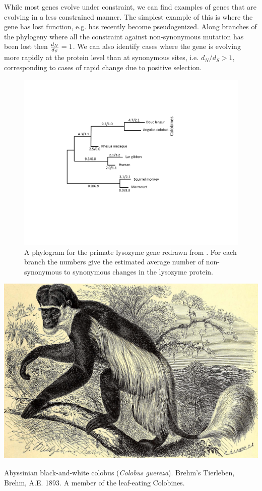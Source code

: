 While most genes evolve under constraint, we can find examples of
genes that are evolving in a less constrained manner. The simplest
example of this is where the gene has lost function, e.g. has recently
become pseudogenized. Along branches of the phylogeny where all the
constraint against non-synonymous mutation has
been lost then $\frac{d_N}{d_S}=1$. We can also identify cases where the gene
is evolving more rapidly at the protein level than at synonymous
sites, i.e. $d_N/d_S > 1$, corresponding to cases of rapid change due
to positive selection. 

\begin{figure}
\begin{center}
\includegraphics[width=0.8 \textwidth]{Journal_figs/genetic_drift/Yang_lysozyme/Yang_lysozyme.pdf}
\end{center}
\caption{A phylogram for the primate lysozyme gene redrawn from
  \citeauthor{Yang:98}. For each branch the numbers give the estimated average
number of non-synonymous to synonymous changes in the lysozyme protein.} \label{fig:lysozyme}  
\end{figure} 

\begin{marginfigure}
\begin{center}
\includegraphics[width=0.8 \textwidth]{illustration_images/Genetic_drift/Colobus/19792029373_fcce706e67_k.jpg}
\end{center}
\caption{Abyssinian black-and-white colobus ({\it Colobus guereza}). Brehm's Tierleben,  Brehm,
  A.E. 1893. A member of the leaf-eating Colobines.} \label{fig:Colobus}  
\end{marginfigure} 

